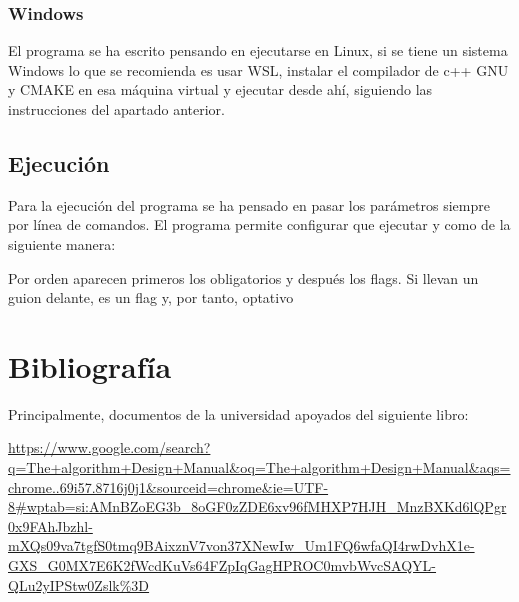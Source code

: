 \documentclass[a4paper, 12.5pt]{report}
\begin{document}
\subsubsection{Windows}

El programa se ha escrito pensando en ejecutarse en Linux, si se tiene un sistema Windows lo que se recomienda es usar WSL, instalar el compilador de c++ GNU y CMAKE en esa máquina virtual y ejecutar desde ahí, siguiendo las instrucciones del apartado anterior.

\subsection{Ejecución}

Para la ejecución del programa se ha pensado en pasar los parámetros siempre por línea de comandos. El programa permite configurar que ejecutar y como de la siguiente manera:

Por orden aparecen primeros los obligatorios y después los flags. Si llevan un guion delante, es un flag y, por tanto, optativo

\section{Bibliografía}

Principalmente, documentos de la universidad apoyados del siguiente libro:

\url{https://www.google.com/search?q=The+algorithm+Design+Manual&oq=The+algorithm+Design+Manual&aqs=chrome..69i57.8716j0j1&sourceid=chrome&ie=UTF-8#wptab=si:AMnBZoEG3b_8oGF0zZDE6xv96fMHXP7HJH_MnzBXKd6lQPgr0x9FAhJbzhl-mXQs09va7tgfS0tmq9BAixznV7von37XNewIw_Um1FQ6wfaQI4rwDvhX1e-GXS_G0MX7E6K2fWcdKuVs64FZpIqGagHPROC0mvbWvcSAQYL-QLu2yIPStw0Zslk%3D}
\end{document}
